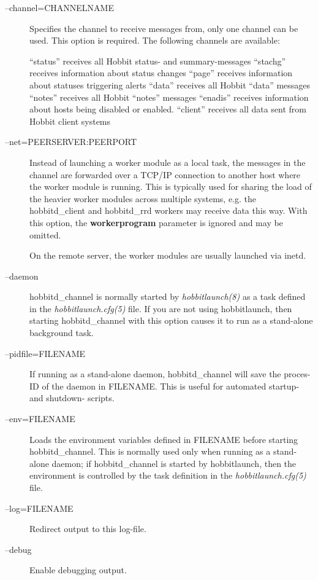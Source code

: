  \begin{description}
\item[--channel=CHANNELNAME] Specifies the channel to receive messages
  from, only one channel can be used. This option is required. The
  following channels are available:  

 ``status'' receives all Hobbit status- and summary-messages  
 ``stachg'' receives information about status changes  
 ``page'' receives information about statuses triggering alerts  
 ``data'' receives all Hobbit ``data'' messages  
 ``notes'' receives all Hobbit ``notes'' messages  
 ``enadis'' receives information about hosts being disabled or enabled.  
 ``client'' receives all data sent from Hobbit client systems 

 

\item[--net=PEERSERVER:PEERPORT] Instead of launching a worker module
  as a local task, the messages in the channel are forwarded over a
  TCP/IP connection to another host where the worker module is
  running. This is typically used for sharing the load of the heavier
  worker modules across multiple systems, e.g. the hobbitd\_client and
  hobbitd\_rrd workers may receive data this way. With this option,
  the \textbf{workerprogram} parameter is ignored and may be omitted.  

 On the remote server, the worker modules are usually launched via inetd. 

 

\item[--daemon] hobbitd\_channel is normally started by
  \emph{hobbitlaunch(8)} as a task defined in the
  \emph{hobbitlaunch.cfg(5)} file. If you are not using hobbitlaunch,
  then starting hobbitd\_channel with this option causes it to run as
  a stand-alone background task. 


 

\item[--pidfile=FILENAME] If running as a stand-alone daemon,
  hobbitd\_channel will save the proces-ID of the daemon in
  FILENAME. This is useful for automated startup- and shutdown-
  scripts. 


 

\item[--env=FILENAME] Loads the environment variables defined in
  FILENAME before starting hobbitd\_channel. This is normally used
  only when running as a stand-alone daemon; if hobbitd\_channel is
  started by hobbitlaunch, then the environment is controlled by the
  task definition in the \emph{hobbitlaunch.cfg(5)} file. 

 

\item[--log=FILENAME] Redirect output to this log-file. 

 

\item[--debug] Enable debugging output. 

 


\end{description}


